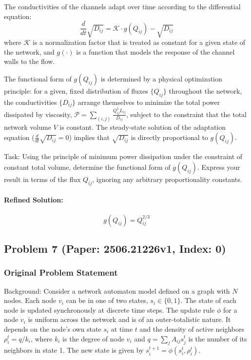 \documentclass[10pt]{article}
\begin{document}
The conductivities of the channels adapt over time according to the differential equation:
$$ \frac{d}{dt}\sqrt{D_{ij}} = \mathcal{K} \cdot g(Q_{ij}) - \sqrt{D_{ij}} $$
where $\mathcal{K}$ is a normalization factor that is treated as constant for a given state of the network, and $g(\cdot)$ is a function that models the response of the channel walls to the flow.

The functional form of $g(Q_{ij})$ is determined by a physical optimization principle: for a given, fixed distribution of fluxes $\{Q_{ij}\}$ throughout the network, the conductivities $\{D_{ij}\}$ arrange themselves to minimize the total power dissipated by viscosity, $\mathcal{P} = \sum_{(i,j)} \frac{Q_{ij}^2 L_{ij}}{D_{ij}}$, subject to the constraint that the total network volume $V$ is constant. The steady-state solution of the adaptation equation ($\frac{d}{dt}\sqrt{D_{ij}} = 0$) implies that $\sqrt{D_{ij}}$ is directly proportional to $g(Q_{ij})$.

Task:
Using the principle of minimum power dissipation under the constraint of constant total volume, determine the functional form of $g(Q_{ij})$. Express your result in terms of the flux $Q_{ij}$, ignoring any arbitrary proportionality constants.

\paragraph*{Refined Solution:}
\[ g(Q_{ij}) = Q_{ij}^{2/3} \]

\newpage
\subsection*{Problem 7 (Paper: 2506.21226v1, Index: 0)}

\subsubsection*{Original Problem Statement}
Background:
Consider a network automaton model defined on a graph with $N$ nodes. Each node $v_i$ can be in one of two states, $s_i \in \{0,1\}$. The state of each node is updated synchronously at discrete time steps. The update rule $\phi$ for a node $v_i$ is uniform across the network and is of an outer-totalistic nature. It depends on the node's own state $s_i$ at time $t$ and the density of active neighbors $\rho_i^t = q/k_i$, where $k_i$ is the degree of node $v_i$ and $q = \sum_{j} A_{ij}s_j^t$ is the number of its neighbors in state 1. The new state is given by $s_i^{t+1} = \phi(s_i^t, \rho_i^t)$.
\end{document}
